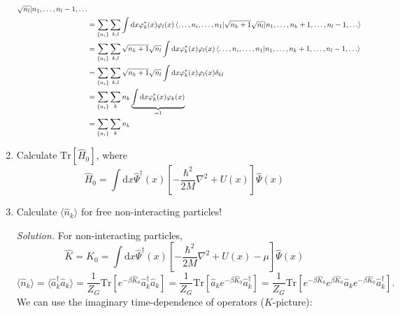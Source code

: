\documentclass[11pt, a4paper]{article}
\newcommand{\dd}{\mathrm{d}}
\newcommand{\Tr}[1]{\mathrm{Tr}\left[#1\right]}
\begin{document}
\begin{enumerate}
\begin{align*}
{        \sqrt{n_l} |n_1, \dots, n_l-1, \dots} \\
        & = \sum\limits_{\{n_i\}}\sum\limits_{k,l}\int\dd x \varphi^*_k(x)\varphi_l(x) \braket{\dots,n_i,\dots,n_1 | 
        \sqrt{n_k+1}\sqrt{n_l} |n_1, \dots, n_k+1, \dots, n_l-1, \dots} \\
        & = \sum\limits_{\{n_i\}}\sum\limits_{k,l} \sqrt{n_k+1}\sqrt{n_l} \int\dd x \varphi^*_k(x)\varphi_l(x) \braket{\dots,n_i,\dots,n_1 |n_1, \dots, n_k+1, \dots, n_l-1, \dots} \\
        & = \sum\limits_{\{n_i\}}\sum\limits_{k,l} \sqrt{n_k+1}\sqrt{n_l} \int\dd x \varphi^*_k(x)\varphi_l(x) \delta_{kl} \\
        & = \sum\limits_{\{n_i\}}\sum\limits_{k} n_k \underbrace{\int\dd x \varphi^*_k(x)\varphi_k(x)}_{=1}\\
        & = \sum\limits_{\{n_i\}}\sum\limits_{k} n_k
    \end{align*}
    \item Calculate $\Tr {\hat H_0}$, where
    \begin{equation*}
        \hat H_0 = \int\dd x \hat\Psi^{\dagger}(x)\left[ -\frac{\hbar^2}{2M}\nabla^2 + U(x) \right]\hat\Psi(x)
    \end{equation*}
    \item Calculate $\langle \hat n_k \rangle$ for free non-interacting particles!
    \par \textit{Solution.}
    For non-interacting particles,
    \begin{equation*}
        \hat K = \hat K_0 = \int\dd x \hat\Psi^{\dagger}(x)\left[ -\frac{\hbar^2}{2M}\nabla^2 + U(x) - \mu \right]\hat\Psi(x)
    \end{equation*}
    \begin{equation*}
        \langle \hat n_k \rangle = \langle \hat a_k^{\dagger}\hat a_k \rangle
        = \frac{1}{Z_G}\Tr{e^{-\beta \hat K_0}\hat a_k^{\dagger}\hat a_k} 
        = \frac{1}{Z_G}\Tr{\hat a_ke^{-\beta \hat K_0}\hat a_k^{\dagger}}
        = \frac{1}{Z_G}\Tr{e^{-\beta \hat K_0}e^{\beta \hat K_0}\hat a_ke^{-\beta \hat K_0}\hat a_k^{\dagger}}.
    \end{equation*}
    We can use the imaginary time-dependence of operators ($K$-picture):
    


\end{enumerate}
\end{document}
